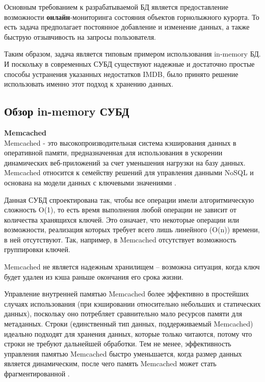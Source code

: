 Основным требованием к разрабатываемой БД является предоставление возможности \textbf{онлайн}-мониторинга состояния объектов горнолыжного курорта. То есть 	задача предполагает постоянное добавление и изменение данных, а также быструю отзывчивость на запросы пользователя.

Таким образом, задача является типовым примером использования in-memory БД. И поскольку в современных СУБД существуют надежные и достаточно простые способы устранения указанных недостатков IMDB, было принято решение использовать именно этот подход к хранению данных.



\subsection{Обзор in-memory СУБД}

\noindent\textbf{Memcached}\\

Memcached - это высокопроизводительная система кэширования данных в оперативной памяти, предназначенная для использования в ускорении динамических веб-приложений за счет уменьшения нагрузки на базу данных. Memcached относится к семейству решений для управления данными NoSQL и основана на модели данных с ключевыми значениями  \cite{memcash}. 

Данная СУБД спроектирована так, чтобы все операции имели алгоритмическую сложность O(1), то есть время выполнения любой операции не зависит от количества хранящихся ключей. Это означает, что некоторые операции или возможности, реализация которых требует всего лишь линейного (O(n)) времени, в ней отсутствуют. Так, например, в Memcached отсутствует возможность группировки ключей.


Memcached не является надежным хранилищем – возможна ситуация, когда ключ будет удален из кэша раньше окончания его срока жизни. 

Управление внутренней памятью Memcached более эффективно в простейших случаях использования (при кэшировании относительно небольших и статических данных), поскольку оно потребляет сравнительно мало ресурсов памяти для метаданных. Строки (единственный тип данных, поддерживаемый Memcached) идеально подходят для хранения данных, которые только читаются, потому что строки не требуют дальнейшей обработки. Тем не менее, эффективность управления памятью Memcached быстро уменьшается, когда размер данных является динамическим, после чего память Memcached может стать фрагментированной \cite{memcash2}. 

